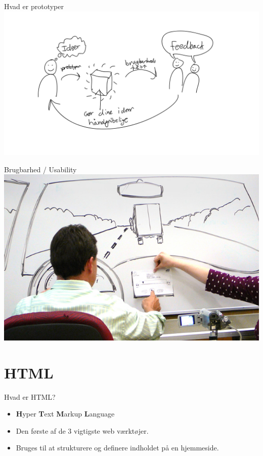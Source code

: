 \documentclass[10pt]{beamer}
\begin{document}
\begin{frame}{Hvad er prototyper}
	\centering
	\includegraphics[scale=0.18]{img/prototypingloop.pdf}
\end{frame}

\begin{frame}{Brugbarhed / Usability}
		\includegraphics[width=\linewidth]{img/carusability.jpg}
\end{frame}


\section{HTML}


\begin{frame}{Hvad er HTML?}
\begin{itemize}
	\item \textbf{H}yper \textbf{T}ext \textbf{M}arkup \textbf{L}anguage
	\item Den første af de 3 vigtigste web værktøjer.
	\item Bruges til at strukturere og definere indholdet på en hjemmeside.
\end{itemize}
\end{frame}
\end{document}
